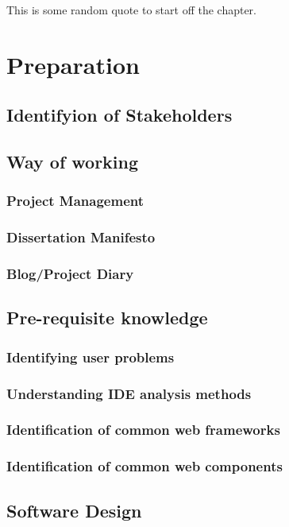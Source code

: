 \begin{savequote}[75mm]
This is some random quote to start off the chapter.
\end{savequote}

\chapter{Preparation}

\section{Identifyion of Stakeholders}
\section{Way of working}
\subsection{Project Management}
\subsection{Dissertation Manifesto}
\subsection{Blog/Project Diary}

\section{Pre-requisite knowledge}
\subsection{Identifying user problems}
\subsection{Understanding IDE analysis methods}
\subsection{Identification of common web frameworks}
\subsection{Identification of common web components}

\section{Software Design}

